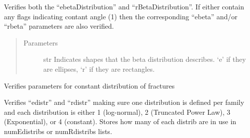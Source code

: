 \documentclass[letterpaper,10pt,english]{sphinxmanual}
\begin{document}
\begin{fulllineitems}
\begin{fulllineitems}
\end{fulllineitems}


\begin{fulllineitems}
\label{\detokenize{pydfnworks:pydfnworks.dfnGen.distributions.distr.beta_distribution}}
Verifies both the “ebetaDistribution” and “rBetaDistribution”. If either contain any flags
indicating contant angle (1) then the corresponding “ebeta” and/or “rbeta” parameters are
also verified.
\begin{quote}\begin{description}
\item[{Parameters}] \leavevmode
{} \textendash{} str
Indicates shapes that the beta distribution describes. ‘e’ if they are ellipses, ‘r’ if they are rectangles.

\end{description}\end{quote}

\end{fulllineitems}


\begin{fulllineitems}
\label{\detokenize{pydfnworks:pydfnworks.dfnGen.distributions.distr.constant_dist}}
Verifies parameters for constant distribution of fractures

\end{fulllineitems}


\begin{fulllineitems}
\label{\detokenize{pydfnworks:pydfnworks.dfnGen.distributions.distr.distr}}
Verifies “edistr” and “rdistr” making sure one distribution is defined per family and
each distribution is either 1 (log-normal), 2 (Truncated Power Law), 3 (Exponential), or 4 (constant).
Stores how many of each distrib are in use in numEdistribs or numRdistribs lists.


\end{fulllineitems}
\end{fulllineitems}
\end{document}
